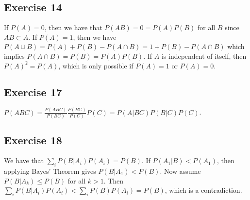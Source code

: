 \subsection{Exercise 14}
If $P(A) = 0$, then we have that $P(AB) = 0 = P(A)P(B)$ for all $B$ since $AB \subset A$.
If $P(A) = 1$, then we have $P(A \cup B) = P(A) + P(B) - P(A \cap B) = 1 + P(B) - P(A \cap B)$
which implies $P(A \cap B) = P(B) = P(A)P(B)$.
If $A$ is independent of itself, then $P(A)^2 = P(A)$, which is only possible if
$P(A) = 1$ or $P(A) = 0$.

\subsection{Exercise 17}
$P(ABC) = \frac{P(ABC)}{P(BC)} \frac{P(BC)}{P(C)} P(C) = P(A | BC) P(B | C) P(C)$.

\subsection{Exercise 18}
We have that $\sum_{i} P(B | A_i) P(A_i) = P(B)$. If $P(A_1 | B) < P(A_1)$, then
applying Bayes' Theorem gives $P(B | A_1) < P(B)$. Now assume $P(B | A_k) \leq P(B)$
for all $k > 1$. Then $\sum_{i} P(B | A_i) P(A_i) < \sum_{i} P(B) P(A_i) = P(B)$,
which is a contradiction.
